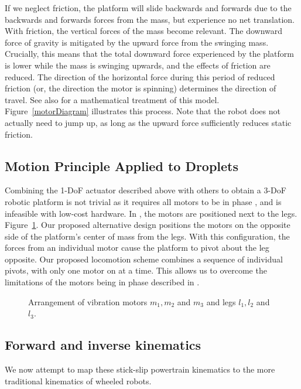 \documentclass[letterpaper, 10pt, conference]{ieeeconf}
\begin{document}
If we neglect friction, the platform will slide backwards and forwards due to the backwards and forwards forces from the mass, but experience no net translation. With friction, the vertical forces of the mass become relevant. The downward force of gravity is mitigated by the upward force from the swinging mass. Crucially, this means that the total downward force experienced by the platform is lower while the mass is swinging upwards, and the effects of friction are reduced. The direction of the horizontal force during this period of reduced friction (or, the direction the motor is spinning) determines the direction of travel. See also \cite{Vartholomeos2005,Vartholomeos2006} for a mathematical treatment of this model. Figure~\ref{motorDiagram} illustrates this process. Note that the robot does not actually need to jump up, as long as the upward force sufficiently reduces static friction. 


\subsection{Motion Principle Applied to Droplets}
Combining the 1-DoF actuator described above with others to obtain a 3-DoF robotic platform is not trivial as it requires all motors to be in phase \cite{Vartholomeos2005}, and is infeasible with low-cost hardware. In \cite{Vartholomeos2005}, the motors are positioned next to the legs. Figure~\ref{DropletMotorDiagram}. Our proposed alternative design positions the motors on the opposite side of the platform's center of mass from the legs. With this configuration, the forces from an individual motor cause the platform to pivot about the leg opposite. Our proposed locomotion scheme combines a sequence of individual pivots, with only one motor on at a time. This allows us to overcome the limitations of the motors being in phase described in \cite{Vartholomeos2005}.

\begin{figure}[!htb]
\centering

\caption{Arrangement of vibration motors $m_1, m_2$ and $m_3$ and legs $l_1, l_2$ and $l_3$.}
\label{DropletMotorDiagram}
\end{figure}

\subsection{Forward and inverse kinematics}
We now attempt to map these stick-slip powertrain kinematics to the more traditional kinematics of wheeled robots.
\end{document}
